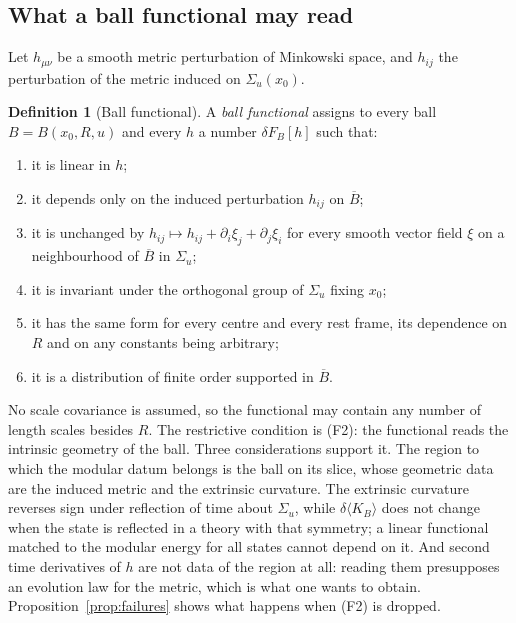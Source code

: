 \documentclass[12pt]{article}
\theoremstyle{definition}
\newtheorem{definition}[theorem]{Definition}
\theoremstyle{remark}
\newcommand{\ev}[1]{\langle #1\rangle}
\begin{document}
\subsection{What a ball functional may read}\label{subsec:balldef}

Let \(h_{\mu\nu}\) be a smooth metric perturbation of Minkowski space, and \(h_{ij}\) the
perturbation of the metric induced on \(\Sigma_u(x_0)\).

\begin{definition}[Ball functional]\label{def:ballfunctional}
A \emph{ball functional} assigns to every ball \(B=B(x_0,R,u)\) and every \(h\) a number
\(\delta F_B[h]\) such that:
\begin{enumerate}[label=(F\arabic*),leftmargin=3em,itemsep=1pt]
\item it is linear in \(h\);
\item it depends only on the induced perturbation \(h_{ij}\) on \(\overline B\);
\item it is unchanged by \(h_{ij}\mapsto h_{ij}+\partial_i\xi_j+\partial_j\xi_i\) for every
smooth vector field \(\xi\) on a neighbourhood of \(\overline B\) in \(\Sigma_u\);
\item it is invariant under the orthogonal group of \(\Sigma_u\) fixing \(x_0\);
\item it has the same form for every centre and every rest frame, its dependence on \(R\)
and on any constants being arbitrary;
\item it is a distribution of finite order supported in \(\overline B\).
\end{enumerate}
\end{definition}

No scale covariance is assumed, so the functional may contain any number of length scales
besides \(R\). The restrictive condition is (F2): the functional reads the intrinsic
geometry of the ball. Three considerations support it. The region to which the modular
datum belongs is the ball on its slice, whose geometric data are the induced metric and
the extrinsic curvature. The extrinsic curvature reverses sign under reflection of time
about \(\Sigma_u\), while \(\delta\ev{K_B}\) does not change when the state is reflected in
a theory with that symmetry; a linear functional matched to the modular energy for all
states cannot depend on it. And second time derivatives of \(h\) are not data of the region
at all: reading them presupposes an evolution law for the metric, which is what one wants
to obtain. Proposition~\ref{prop:failures} shows what happens when (F2) is dropped.
\end{document}
